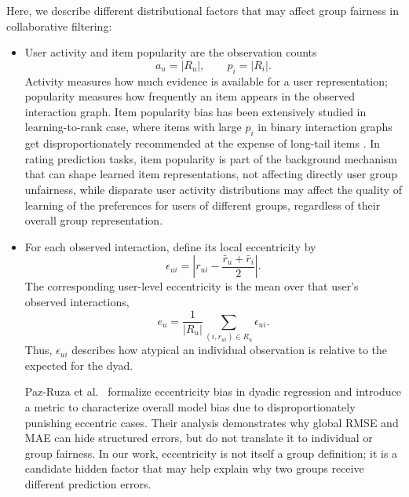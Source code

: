 \documentclass[11pt]{article}
\begin{document}
Here, we describe different distributional factors that may affect group fairness in collaborative filtering: 
\begin{itemize}
    \item User activity and item popularity are the observation counts
\begin{equation}
    a_u=|R_u|,\qquad p_i=|R_i|.
    \label{eq:activity-popularity}
\end{equation}
Activity measures how much evidence is available for a user representation;
popularity measures how frequently an item appears in the observed
interaction graph. Item popularity bias has been extensively studied in learning-to-rank case, where items with large  $p_i$ in binary interaction graphs get disproportionately recommended at the expense of long-tail
items \cite{jannach2015,abdollahpouri2017,abdollahpouri2021}. In rating prediction tasks,
item popularity is part of the background mechanism that can shape learned item
representations, not affecting directly user group unfairness, while disparate user activity distributions may affect the quality of learning of the preferences for users of different groups, regardless of their overall group representation. 

\item For each observed interaction, define its local eccentricity by
\begin{equation}
    \epsilon_{ui}=\left|r_{ui}-\frac{\bar r_u+\bar r_i}{2}\right|.
    \label{eq:rating-eccentricity}
\end{equation}
The corresponding user-level eccentricity is the mean over that user's
observed interactions,
\begin{equation}
    e_u=\frac{1}{|R_u|}\sum_{(i,r_{ui})\in R_u}\epsilon_{ui}.
    \label{eq:user-eccentricity}
\end{equation}
Thus, $\epsilon_{ui}$ describes how atypical an
individual observation is relative to the expected for the dyad. 

Paz-Ruza et al.~\cite{pazruza2025} formalize eccentricity bias in dyadic
regression and introduce a metric to characterize overall model bias due to disproportionately punishing eccentric cases. Their analysis demonstrates
why global RMSE and MAE can hide structured errors, but do not translate it to individual or group fairness. In our work, eccentricity is not
itself a group definition; it is a candidate hidden factor that may help
explain why two groups receive different prediction errors.

\end{itemize}
\end{document}
